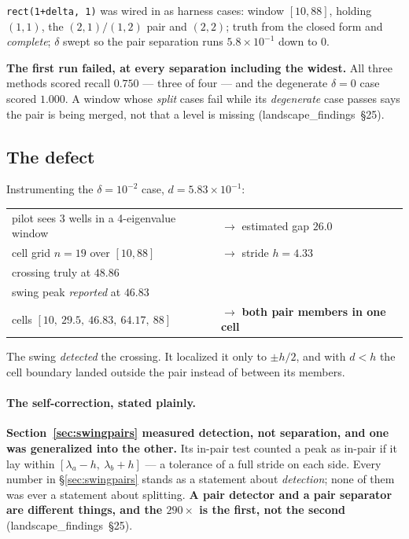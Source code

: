 \documentclass[11pt]{article}
\newcommand{\lf}[1]{(landscape\_findings~\S#1)}
\newcommand{\lam}{\lambda}
\begin{document}
\verb|rect(1+delta, 1)| was wired in as harness cases: window $[10, 88]$, holding $(1,1)$, the
$(2,1)/(1,2)$ pair and $(2,2)$; truth from the closed form and \emph{complete}; $\delta$ swept so
the pair separation runs $5.8\times10^{-1}$ down to $0$.

\textbf{The first run failed, at every separation including the widest.} All three methods scored
recall $0.750$ --- three of four --- and the degenerate $\delta = 0$ case scored $1.000$. A window
whose \emph{split} cases fail while its \emph{degenerate} case passes says the pair is being
merged, not that a level is missing \lf{25}.

\subsection{The defect}

Instrumenting the $\delta = 10^{-2}$ case, $d = 5.83\times10^{-1}$:
\begin{center}
\begin{tabular}{ll}
\toprule
pilot sees 3 wells in a 4-eigenvalue window & $\to$ estimated gap $26.0$ \\
cell grid $n = 19$ over $[10, 88]$          & $\to$ stride $h = 4.33$ \\
crossing truly at $48.86$                   & \\
swing peak \emph{reported} at $46.83$       & \\
cells $[10,\ 29.5,\ 46.83,\ 64.17,\ 88]$    & $\to$ \textbf{both pair members in one cell} \\
\bottomrule
\end{tabular}
\end{center}
The swing \emph{detected} the crossing. It localized it only to $\pm h/2$, and with $d < h$ the
cell boundary landed outside the pair instead of between its members.

\paragraph{The self-correction, stated plainly.}
\textbf{Section~\ref{sec:swingpairs} measured detection, not separation, and one was generalized
into the other.} Its in-pair test counted a peak as in-pair if it lay within
$[\lam_a - h,\ \lam_b + h]$ --- a tolerance of a full stride on each side. Every number in
\S\ref{sec:swingpairs} stands as a statement about \emph{detection}; none of them was ever a
statement about splitting. \textbf{A pair detector and a pair separator are different things, and
the $290\times$ is the first, not the second} \lf{25}.
\end{document}
